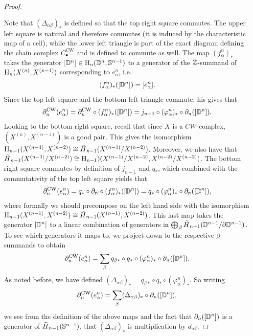 \begin{proof}
\begin{enumerate}
    \end{enumerate}
    Note that $(\Delta_{\alpha\beta})_\ast$ is defined so that the top right square commutes. The upper left square is natural and therefore commutes (it is induced by the characteristic map of a cell), while the lower left triangle is part of the exact diagram defining the chain complex $C_\bullet^{\mathrm{CW}}$ and is defined to commute as well. The map $(f_\alpha^n)_\ast$ takes the generator $[\mathbb{D}^n]\in \mathrm{H}_n(\mathbb{D}^n,\mathbb{S}^{n-1})$ to a generator of the $\mathbb{Z}$-summand of $\mathrm{H}_n(X^{(n)},X^{(n-1)})$ corresponding to $e^n_\alpha$, i.e.\ 
    \[(f^n_\alpha)_\ast([\mathbb{D}^n])=[e^n_\alpha].\]
    Since the top left square and the bottom left triangle commute, his gives that 
    \[\partial_n^{\mathrm{CW}}(e^n_\alpha)=\partial_n^{\mathrm{CW}}\circ (f^n_\alpha)_\ast([\mathbb{D}^n])=j_{n-1}\circ (\varphi_\alpha^n)_\ast\circ \partial_n([\mathbb{D}^n]).\]
    Looking to the bottom right square, recall that since $X$ is a $CW$-complex, $(X^{(n)},X^{(n-1)})$ is a good pair. This gives the isomorphism $\rmH_{n-1}(X^{(n-1)},X^{(n-2)})\cong \wt{H}_{n-1}(X^{(n-1)}\slash X^{(n-2)})$. Moreover, we also have that $\wt{H}_{n-1}(X^{(n-1)}\slash X^{(n-2)})\cong \rmH_{n-1})(X^{(n-1)}\slash X^{(n-2)},X^{(n-2)}\slash X^{(n-2)})$. The bottom right square commutes by definition of $j_{n-1}$ and $q_\ast$, which combined with the commutativity of the top left square yields that
    \[\partial_n^{\mathrm{CW}}(e^n_\alpha)=q_\ast\circ \partial_n\circ (f_\alpha^n)_\ast([\mathbb{D}^n])=q_\ast\circ (\varphi^n_\alpha)_\ast\circ \partial_n([\mathbb{D}^n]),\]
    where formally we should precompose on the left hand side with the isomorphism $\rmH_{n-1}(X^{(n-1)},X^{(n-2)})\cong \wt{H}_{n-1}(X^{(n-1)},X^{(n-2)})$. This last map takes the generator $[\mathbb{D}^n]$ to a linear combination of generators in $\bigoplus_\beta \wt{H}_{n-1}(\bbD^{n-1}\slash \partial \bbD^{n-1})$. To see which generators it maps to, we project down to the respective $\beta$ summands to obtain
    \[\partial_n^{\mathrm{CW}}(e^n_\alpha)=\sum_\beta q_{\beta\ast}\circ q_\ast\circ (\varphi^n_\alpha)_\ast\circ \partial_n([\mathbb{D}^n]).\]
    As noted before, we have defined $(\Delta_{\alpha\beta})_\ast=q_{\beta\ast}\circ q_\ast\circ (\varphi^n_\alpha)_\ast$. So writing
    \[\partial_n^{\mathrm{CW}}(e^n_\alpha)=\sum_\beta (\Delta_{\alpha\beta})_\ast \circ \partial_n([\mathbb{D}^n]),\]
    we see from the definition of the above maps and the fact that $\partial_n([\mathbb{D}^n])$ is a generator of $\wt{H}_{n-1}(\bbS^{n-1})$, that $(\Delta_{\alpha\beta})_\ast$ is multiplication by $d_{\alpha\beta}$.
\end{proof}


